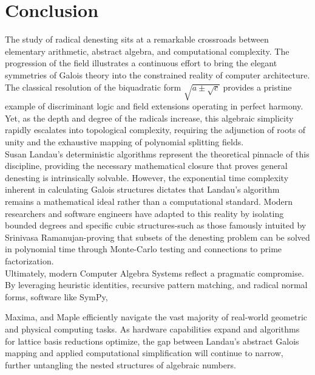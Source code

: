 \documentclass[10pt]{article}
\begin{document}
\section*{Conclusion}
The study of radical denesting sits at a remarkable crossroads between elementary arithmetic, abstract algebra, and computational complexity. The progression of the field illustrates a continuous effort to bring the elegant symmetries of Galois theory into the constrained reality of computer architecture. The classical resolution of the biquadratic form $\sqrt{a \pm \sqrt{c}}$ provides a pristine example of discriminant logic and field extensions operating in perfect harmony. Yet, as the depth and degree of the radicals increase, this algebraic simplicity rapidly escalates into topological complexity, requiring the adjunction of roots of unity and the exhaustive mapping of polynomial splitting fields.\\
Susan Landau's deterministic algorithms represent the theoretical pinnacle of this discipline, providing the necessary mathematical closure that proves general denesting is intrinsically solvable. However, the exponential time complexity inherent in calculating Galois structures dictates that Landau's algorithm remains a mathematical ideal rather than a computational standard. Modern researchers and software engineers have adapted to this reality by isolating bounded degrees and specific cubic structures-such as those famously intuited by Srinivasa Ramanujan-proving that subsets of the denesting problem can be solved in polynomial time through Monte-Carlo testing and connections to prime factorization.\\
Ultimately, modern Computer Algebra Systems reflect a pragmatic compromise. By leveraging heuristic identities, recursive pattern matching, and radical normal forms, software like SymPy,

Maxima, and Maple efficiently navigate the vast majority of real-world geometric and physical computing tasks. As hardware capabilities expand and algorithms for lattice basis reductions optimize, the gap between Landau's abstract Galois mapping and applied computational simplification will continue to narrow, further untangling the nested structures of algebraic numbers.
\end{document}
